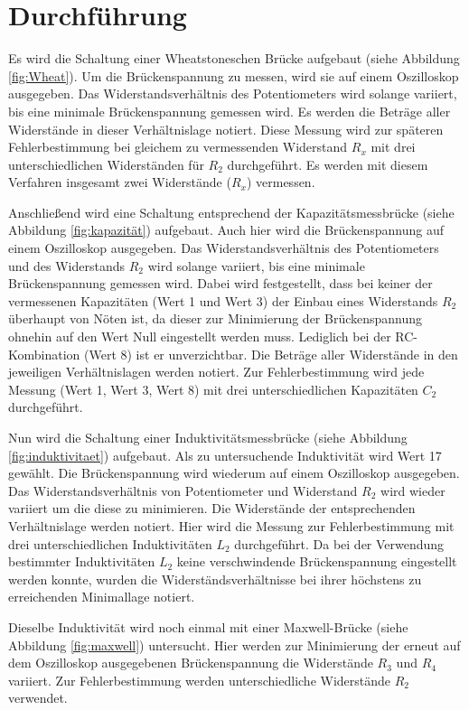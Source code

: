 \section{Durchführung}
\label{sec:Durchführung}

Es wird die Schaltung einer Wheatstoneschen Brücke aufgebaut (siehe Abbildung \ref{fig:Wheat}).
Um die Brückenspannung zu messen, wird sie auf einem Oszilloskop ausgegeben.
Das Widerstandsverhältnis des Potentiometers wird solange variiert, bis eine minimale
Brückenspannung gemessen wird. Es werden die Beträge aller Widerstände in
dieser Verhältnislage notiert. Diese Messung wird zur späteren Fehlerbestimmung bei gleichem zu
vermessenden Widerstand $R_x$ mit drei unterschiedlichen Widerständen für $R_2$ durchgeführt.
Es werden mit diesem Verfahren insgesamt zwei Widerstände ($R_x$) vermessen.

Anschließend wird eine Schaltung entsprechend der Kapazitätsmessbrücke (siehe Abbildung \ref{fig:kapazität})
aufgebaut. Auch hier wird die Brückenspannung auf einem Oszilloskop ausgegeben.
Das Widerstandsverhältnis des Potentiometers und des Widerstands $R_2$ wird solange variiert, bis eine minimale
Brückenspannung gemessen wird. Dabei wird festgestellt, dass bei keiner der
vermessenen Kapazitäten (Wert 1 und Wert 3) der Einbau eines Widerstands $R_2$
überhaupt von Nöten ist, da dieser zur Minimierung der Brückenspannung ohnehin auf
den Wert Null eingestellt werden muss. Lediglich bei der RC-Kombination (Wert 8)
ist er unverzichtbar. Die Beträge aller Widerstände in den jeweiligen Verhältnislagen
werden notiert. Zur Fehlerbestimmung wird jede Messung (Wert 1, Wert 3, Wert 8)
mit drei unterschiedlichen Kapazitäten $C_2$ durchgeführt.

Nun wird die Schaltung einer Induktivitätsmessbrücke (siehe Abbildung \ref{fig:induktivitaet}) aufgebaut.
Als zu untersuchende Induktivität wird Wert 17 gewählt.
Die Brückenspannung wird wiederum auf einem Oszilloskop ausgegeben.
Das Widerstandsverhältnis von Potentiometer und Widerstand $R_2$ wird wieder
variiert um die diese zu minimieren. Die Widerstände der entsprechenden
Verhältnislage werden notiert. Hier wird die Messung zur Fehlerbestimmung mit
drei unterschiedlichen Induktivitäten $L_2$ durchgeführt.
Da bei der Verwendung bestimmter Induktivitäten $L_2$ keine verschwindende
Brückenspannung eingestellt werden konnte, wurden die Widerständsverhältnisse
bei ihrer höchstens zu erreichenden Minimallage notiert.

Dieselbe Induktivität wird noch einmal mit einer Maxwell-Brücke (siehe Abbildung \ref{fig:maxwell}) untersucht.
Hier werden zur Minimierung der erneut auf dem Oszilloskop ausgegebenen Brückenspannung
die Widerstände $R_3$ und $R_4$ variiert. Zur Fehlerbestimmung werden unterschiedliche
Widerstände $R_2$ verwendet.

